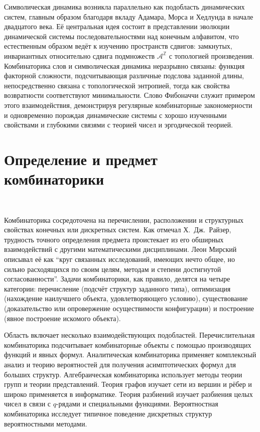 \documentclass[a4paper,14pt]{extreport}
\theoremstyle{plain}
\theoremstyle{definition}
\theoremstyle{remark}
\begin{document}
Символическая динамика возникла параллельно как подобласть динамических 
систем, главным образом благодаря вкладу Адамара, Морса 
и Хедлунда в начале двадцатого века. Её центральная идея состоит в представлении эволюции динамической системы последовательностями над конечным алфавитом, что естественным образом ведёт к изучению пространств сдвигов: 
замкнутых, инвариантных относительно сдвига подмножеств $\mathcal{A}^{\mathbb{Z}}$ 
с топологией произведения. Комбинаторика слов и символическая динамика неразрывно связаны: функция факторной сложности, подсчитывающая различные подслова заданной длины, непосредственно связана с топологической энтропией, тогда как свойства возвратности соответствуют минимальности. Слово Фибоначчи служит примером этого взаимодействия, демонстрируя регулярные комбинаторные закономерности и одновременно порождая динамические системы с хорошо изученными свойствами и глубокими связями с теорией чисел и эргодической теорией.

\section{Определение и предмет комбинаторики}~\label{sec1.2}

Комбинаторика сосредоточена на перечислении, расположении и структурных свойствах конечных или дискретных систем. Как отмечал Х.~Дж.~Райзер, трудность точного определения предмета проистекает из его обширных взаимодействий с другими математическими дисциплинами. Леон Мирский описывал её как ``круг связанных исследований, имеющих нечто общее, но сильно расходящихся по своим целям, методам и степени достигнутой согласованности''. Задачи комбинаторики, как правило, делятся на четыре категории: перечисление (подсчёт структур заданного типа), оптимизация (нахождение наилучшего объекта, удовлетворяющего условию), существование (доказательство или 
опровержение осуществимости конфигурации) и построение (явное построение искомого объекта).

Область включает несколько взаимодействующих подобластей. Перечислительная комбинаторика подсчитывает комбинаторные объекты с помощью производящих функций и явных формул. Аналитическая комбинаторика применяет комплексный анализ и теорию вероятностей для получения асимптотических формул для больших структур. Алгебраическая комбинаторика использует методы теории групп и теории представлений. Теория графов изучает сети из вершин и рёбер и широко применяется в информатике. 
Теория разбиений изучает разбиения целых чисел в связи с $q$-рядами и специальными функциями. Вероятностная комбинаторика исследует типичное поведение дискретных структур вероятностными методами.
\end{document}
